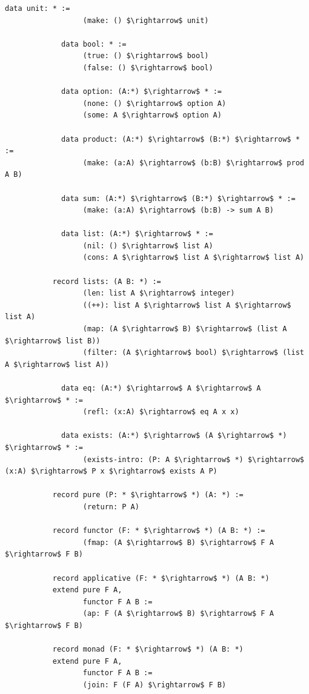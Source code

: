 \documentclass[11pt,oneside]{article}
\begin{document}
\begin{lstlisting}[mathescape=true]
             data unit: * :=
                  (make: () $\rightarrow$ unit)

             data bool: * :=
                  (true: () $\rightarrow$ bool)
                  (false: () $\rightarrow$ bool)

             data option: (A:*) $\rightarrow$ * :=
                  (none: () $\rightarrow$ option A)
                  (some: A $\rightarrow$ option A)

             data product: (A:*) $\rightarrow$ (B:*) $\rightarrow$ * :=
                  (make: (a:A) $\rightarrow$ (b:B) $\rightarrow$ prod A B)

             data sum: (A:*) $\rightarrow$ (B:*) $\rightarrow$ * :=
                  (make: (a:A) $\rightarrow$ (b:B) -> sum A B)

             data list: (A:*) $\rightarrow$ * :=
                  (nil: () $\rightarrow$ list A)
                  (cons: A $\rightarrow$ list A $\rightarrow$ list A)

           record lists: (A B: *) :=
                  (len: list A $\rightarrow$ integer)
                  ((++): list A $\rightarrow$ list A $\rightarrow$ list A)
                  (map: (A $\rightarrow$ B) $\rightarrow$ (list A $\rightarrow$ list B))
                  (filter: (A $\rightarrow$ bool) $\rightarrow$ (list A $\rightarrow$ list A))

             data eq: (A:*) $\rightarrow$ A $\rightarrow$ A $\rightarrow$ * :=
                  (refl: (x:A) $\rightarrow$ eq A x x)

             data exists: (A:*) $\rightarrow$ (A $\rightarrow$ *) $\rightarrow$ * :=
                  (exists-intro: (P: A $\rightarrow$ *) $\rightarrow$ (x:A) $\rightarrow$ P x $\rightarrow$ exists A P)

           record pure (P: * $\rightarrow$ *) (A: *) :=
                  (return: P A)

           record functor (F: * $\rightarrow$ *) (A B: *) :=
                  (fmap: (A $\rightarrow$ B) $\rightarrow$ F A $\rightarrow$ F B)

           record applicative (F: * $\rightarrow$ *) (A B: *)
           extend pure F A,
                  functor F A B :=
                  (ap: F (A $\rightarrow$ B) $\rightarrow$ F A $\rightarrow$ F B)

           record monad (F: * $\rightarrow$ *) (A B: *)
           extend pure F A,
                  functor F A B :=
                  (join: F (F A) $\rightarrow$ F B)

\end{lstlisting}
\end{document}
